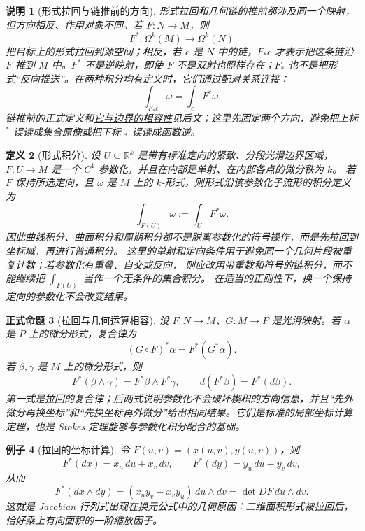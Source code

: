 \documentclass[UTF8,fontset=none,a4paper,11pt]{ctexart}
\theoremstyle{foundation-definition}
\newtheorem{definition}{定义}[section]
\theoremstyle{foundation-theorem}
\theoremstyle{foundation-proposition}
\newtheorem{proposition}[definition]{正式命题}
\theoremstyle{foundation-example}
\newtheorem{example}[definition]{例子}
\theoremstyle{foundation-remark}
\newtheorem{remark}[definition]{说明}
\theoremstyle{foundation-theorem}
\newcommand{\term}[2]{\hyperref[#1]{#2}}
\begin{document}
\begin{remark}[形式拉回与链推前的方向]
形式拉回和几何链的推前都涉及同一个映射，但方向相反、作用对象不同。若
\(F:N\to M\)，则
\[
F^*:\Omega^k(M)\longrightarrow\Omega^k(N)
\]
把目标上的形式拉回到源空间；相反，若 \(c\) 是 \(N\) 中的链，\term{def:chain-pushforward}{\(F_*c\)}
才表示把这条链沿 \(F\) 推到 \(M\) 中。\(F^*\) 不是逆映射，即使 \(F\) 不是双射也照样存在；\(F_*\)
也不是把形式“反向推送”。在两种积分均有定义时，它们通过配对关系连接：
\[
\int_{F_*c}\omega=\int_cF^*\omega.
\]
链推前的正式定义和\term{prop:boundary-pushforward}{它与边界的相容性}见后文；这里先固定两个方向，避免把上标 \(^*\)
误读成集合原像或把下标 \(_*\) 误读成函数逆。
\end{remark}

\begin{definition}[形式积分]\label{def:form-integral}
设 \(U\subseteq\mathbb R^k\) 是带有标准定向的紧致、分段光滑边界区域，
\(F:U\to M\) 是一个 \(C^1\) 参数化，并且在内部是单射、在内部各点的微分秩为 \(k\)。
若 \(F\) 保持所选定向，且 \(\omega\) 是 \(M\) 上的 \(k\)-形式，则形式沿该参数化子流形的积分定义为
\[
\int_{F(U)}\omega:=\int_UF^*\omega.
\]
因此曲线积分、曲面积分和周期积分都不是脱离参数化的符号操作，而是先拉回到坐标域，再进行普通积分。
这里的单射和定向条件用于避免同一个几何片段被重复计数；若参数化有重叠、自交或反向，
则应改用带重数和符号的链积分，而不能继续把 \(\int_{F(U)}\) 当作一个无条件的集合积分。
在适当的正则性下，换一个保持定向的参数化不会改变结果。
\end{definition}

\begin{proposition}[拉回与几何运算相容]
设 \(F:N\to M\)、\(G:M\to P\) 是光滑映射。若 \(\alpha\) 是 \(P\) 上的微分形式，复合律为
\[
 (G\circ F)^*\alpha=F^*(G^*\alpha).
\]
若 \(\beta,\gamma\) 是 \(M\) 上的微分形式，则
\[
 F^*(\beta\wedge\gamma)=F^*\beta\wedge F^*\gamma,
 \qquad
 d(F^*\beta)=F^*(d\beta).
\]
第一式是拉回的复合律；后两式说明参数化不会破坏楔积的方向信息，并且“先外微分再换坐标”和“先换坐标再外微分”给出相同结果。它们是标准的局部坐标计算定理，也是 Stokes 定理能够与参数化积分配合的基础。
\end{proposition}

\begin{example}[拉回的坐标计算]
令 \(F(u,v)=(x(u,v),y(u,v))\)，则
\[
 F^*(dx)=x_u\,du+x_v\,dv,
 \qquad
 F^*(dy)=y_u\,du+y_v\,dv,
\]
从而
\[
 F^*(dx\wedge dy)
 =(x_uy_v-x_vy_u)\,du\wedge dv
 =\det DF\,du\wedge dv.
\]
这就是 Jacobian 行列式出现在换元公式中的几何原因：二维面积形式被拉回后，恰好乘上有向面积的一阶缩放因子。
\end{example}
\end{document}
